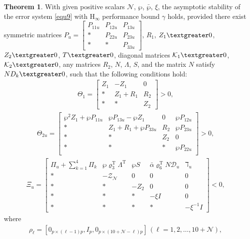 \documentclass[preprint,review,fleqn,sort&compress,3p]{elsarticle}
\theoremstyle{definition}%
\newtheorem{thm}{Theorem}[section]
\begin{document}
\begin{thm}\label{thm1}
	With given positive scalars  $\mathcal{N}$, $ \wp$, $\bar{\wp}$, $\xi $, the asymptotic stability of the error system \eqref{equ9} with $ \text{H}_{\infty} $ performance bound $\gamma$ holds, provided there exist symmetric matrices $P_u=\begin{bmatrix}
		P_{11u} & P_{12u} & P_{13u} \\
		* & P_{22u} & P_{23u} \\
		* & * & P_{33u}
	\end{bmatrix}$, $R_1$, $Z_1 \textgreater 0$, $Z_2 \textgreater 0$, $T \textgreater 0$, diagonal matrices $\mathcal{K}_1 \textgreater 0$, $\mathcal{K}_2 \textgreater 0$, any matrices  $R_2$, $N$, $\Lambda$, $S$, and the matrix $N$ satisfy $N D_k \textgreater 0$, such that the following conditions hold:
	\begin{align}\label{positive definition}
		\Theta_1 = \begin{bmatrix}
			Z_1 & -Z_1 & 0 \\
			* & Z_1 + R_1 & R_2 \\
			* & * & Z_2
		\end{bmatrix} > 0,
	\end{align}
	\begin{align}
		\Theta_{2u} = \begin{bmatrix}
			\wp^2 Z_1 + \wp P_{11u} & \wp P_{13u} - \wp Z_1 & 0 & \wp P_{12u} \\
			* & Z_1 + R_1 + \wp P_{33u} & R_2 & \wp P_{23u} \\
			* & *& Z_2 & 0 \\
			* & * & * & \wp P_{22u} \\
		\end{bmatrix} > 0,
	\end{align}
	\begin{align}\label{equ12}
		\Xi_u = \begin{bmatrix}
			\Pi_u+\sum_{k=1}^4 \Pi_k & \wp\varrho^\text{T}_3 \Lambda^\text{T} & \wp S & \bar{\alpha}\varrho_6^\text{T} N \mathcal{D}_u & \daleth_u\\
			* & -\mathcal{Z}_\mathcal{N} & 0 & 0 &0 \\
			* & * & -Z_2 & 0 & 0\\
			* & * &* & -\xi I & 0\\
			* & * &* & * & -\xi^{-1} I
		\end{bmatrix} < 0,
	\end{align}
	where
	\begin{align*}
		\rho_\ell = \left[ 0_{p \times (\ell-1)p}, I_p, 0_{p \times (10+\mathcal{N}-\ell)p} \right] \, (\ell = 1, 2, \dots, 10 + \mathcal{N}),

\end{align*}
\end{thm}
\end{document}

